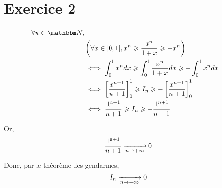 \part{Exercice 2}
\section{}


\begin{comment}
	
On sait que $0 \le x \le 1$.\\

\begin{align*}
	I_n = \int_{0}^{1} \frac{x^n}{1+x} dx &= \lim_{h \to 1} \int_{0}^{h} \frac{x^n}{1+x} dx  \\
\end{align*}

Or, $0 \le x \le h < 1$ donc $\lim_{n\to +\infty}x^n=0$.\\
Donc,
\begin{align*}
	\lim_{n \to +\infty} \lim_{h\to 1} \int_{0}^{h} \frac{x^n}{1+x} dx = 0 \\
\end{align*}

\end{comment}

\begin{align*}
	\forall n\in \N,\\
	&\left(\forall x \in [0,1], x^n \ge \frac{x^n}{1+x} \ge -x^n\right)\\
	&\iff \int_{0}^{1} x^n dx \ge \int_{0}^{1} \frac{x^n}{1 + x} dx \ge - \int_{0}^{1} x^ndx\\
	&\iff \left[ \frac{x^{n+1}}{n+1} \right] _0^1 \ge I_n \ge -\left[ \frac{x^{n+1}}{n+1} \right] ^1_0\\
	&\iff \frac{1^{n+1}}{n+1}\ge I_n \ge -\frac{1^{n+1}}{n+1}\\
\end{align*}

Or,  \[
\frac{1^{n+1}}{n+1} \xrightarrow[n\to +\infty]{} 0
\] 

Donc, par le théorème des gendarmes, \[
I_n \xrightarrow[n\to +\infty]{} 0
\]



